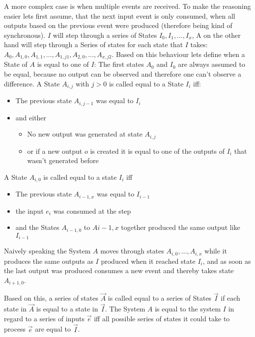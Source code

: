 A more complex case is when multiple events are received. To make the reasoning easier lets first assume, that the next
input event is only consumed, when all outputs based on the previous event were produced (therefore being kind of synchronous).
\(I\) will step through a series of States \(I_0, I_1, \dots, I_x\), A on the other hand will step through a Series of
states for each state that \(I\) takes: \(A_0,A_{1,0},A_{1,1},\dots,A_{1,j1},A_{2,0}, \dots,A_{x,j2}\).
Based on this behaviour lets define when a State of \(A\) is equal to one of \(I\):
The first states \(A_0\) and \(I_0\) are always assumed to be equal, because no output can be observed and therefore one
can't observe a difference.
A State \(A_{i,j}\) with \(j > 0\) is called equal to a State \(I_{i}\) iff:
\begin{itemize}
    \item The previous state \(A_{i,j-1}\) was equal to \(I_{i}\)
    \item and either
    \begin{itemize}
        \item No new output was generated at state \(A_{i,j}\)
        \item or if a new output \(o\) is created it is equal to one of the outputs of \(I_{i}\) that wasn't generated before
    \end{itemize}
\end{itemize}

A State \(A_{i,0}\) is called equal to a state \(I_{i}\) iff
\begin{itemize}
    \item The previous state \(A_{i-1,x}\) was equal to \(I_{i-1}\)
    \item the input \(e_i\) was consumed at the step
    \item and the States \(A_{i-1,0}\) to \(A{i-1,x}\) together produced the same output like \(I_{i-1}\)
\end{itemize}

Naively speaking the System \(A\) moves through states \(A_{i,0},\dots,A_{i,x}\) while it produces the same outputs as \(I\)
produced when it reached state \(I_i\), and as soon as the last output was produced consumes a new event and thereby takes
state \(A_{i+1,0}\).

Based on this, a series of states \(\vec{A}\) is called equal to a series of States \(\vec{I}\) if each state in \(\vec{A}\)
is equal to a state in \(\vec{I}\).
The System \(A\) is equal to the system \(I\) in regard to a series of inputs \(\vec{e}\) iff all possible series of
states it could take to process \(\vec{e}\) are equal to \(\vec{I}\).

